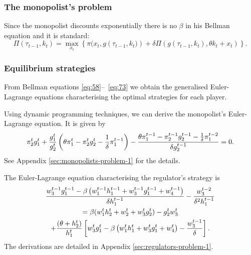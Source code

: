 \subsubsection{The monopolist's problem}

\label{sec:monopolists-problem}

Since the monopolist discounts exponentially there is no $\beta$ in his
Bellman equation and it is standard: 
\begin{equation}
\Pi (\tau _{t-1},k_{t})=\max_{x_{t}}\left\{ \pi (x_{t},g\left( \tau
_{t-1},k_{t})\right) +\delta \Pi \left( g(\tau _{t-1},k_{t}),\theta
k_{t}+x_{t}\right) \right\} .  \label{eq:73}
\end{equation}

\subsubsection{Equilibrium strategies}

\label{sec:equil-strat-1}

From Bellman equations \eqref{eq:58}--~\eqref{eq:73} we obtain the
generalised Euler-Lagrange equations characterising the optimal strategies
for each player.

Using dynamic programming techniques, we can derive the monopolist's
Euler-Lagrange equation. It is given by%
\begin{equation}
\pi _{2}^{t}g_{1}^{t}+\frac{g_{1}^{t}}{g_{2}^{t}}\left( \theta \pi
_{1}^{t}-\pi _{2}^{t}g_{2}^{t}-\frac{1}{\delta }\pi _{1}^{t-1}\right) -\frac{%
\theta \pi _{1}^{t-1}-\pi _{2}^{t-1}g_{2}^{t-1}-\frac{1}{\delta }\pi
_{1}^{t-2}}{\delta g_{2}^{t-1}}=0.  \label{eq:84}
\end{equation}%
See Appendix \ref{sec:monopolists-problem-1} for the details.

The Euler-Lagrange equation characterising the regulator's strategy is 
\begin{multline}
\frac{w_{3}^{t-1}g_{1}^{t-1}-\beta \left(
w_{1}^{t-1}h_{1}^{t-1}+w_{3}^{t-1}g_{1}^{t-1}+w_{4}^{t-1}\right) }{\delta
h_{1}^{t-1}}-\frac{w_{3}^{t-2}}{\delta ^{2}h_{1}^{t-1}}  \label{eq:30} \\
=\beta (w_{1}^{t}h_{2}^{t}+w_{2}^{t}+w_{3}^{t}g_{2}^{t})-g_{2}^{t}w_{3}^{t}
\\
+\frac{\left( \theta +h_{2}^{t}\right) }{h_{1}^{t}}\left[
w_{3}^{t}g_{1}^{t}-\beta \left(
w_{1}^{t}h_{1}^{t}+w_{3}^{t}g_{1}^{t}+w_{4}^{t}\right) -\frac{w_{3}^{t-1}}{%
\delta }\right] .
\end{multline}%
The derivations are detailed in Appendix \ref{sec:regulators-problem-1}.

